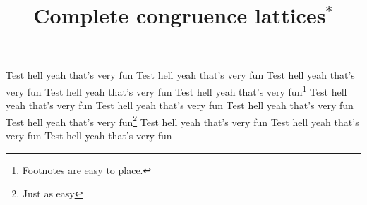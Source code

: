 \documentclass[%
twocolumn,%
legalpaper,%
twoside%
]{amsart}
\title[Complete congruence lattices]{
    Complete congruence lattices$^*$
}
\begin{document}
{
\renewcommand{\thefootnote}{\fnsymbol{footnote}}
\setcounter{footnote}{1}
\setcounter{footnote}{0}
}
\maketitle

Test hell yeah that's very fun
Test hell yeah that's very fun
Test hell yeah that's very fun
Test hell yeah that's very fun
Test hell yeah that's very fun\footnote{Footnotes are easy to place.}
Test hell yeah that's very fun
Test hell yeah that's very fun
Test hell yeah that's very fun
Test hell yeah that's very fun\footnote{Just as easy}
Test hell yeah that's very fun
Test hell yeah that's very fun
Test hell yeah that's very fun
\begin{comment}
    Test hell yeah that's very fun
    Test hell yeah that's very fun
    Test hell yeah that's very fun
    Test hell yeah that's very fun
    Test hell yeah that's very fun
    Test hell yeah that's very fun
    Test hell yeah that's very fun
    Test hell yeah that's very fun
    Test hell yeah that's very fun
    Test hell yeah that's very fun
    Test hell yeah that's very fun
    Test hell yeah that's very fun
\end{comment}
\end{document}
